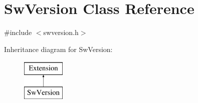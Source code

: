 \hypertarget{classSwVersion}{
\section{SwVersion Class Reference}
\label{classSwVersion}
}


{\ttfamily \#include $<$swversion.h$>$}

Inheritance diagram for SwVersion:\begin{figure}[H]
\begin{center}
\leavevmode
\includegraphics[height=2.000000cm]{classSwVersion}
\end{center}
\end{figure}
